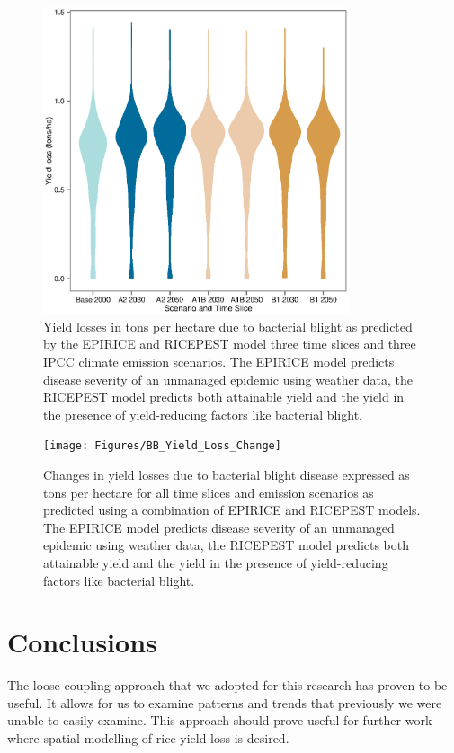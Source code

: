 \documentclass[preprint,12pt]{elsarticle}
\begin{document}
\begin{figure}[H]
  \includegraphics[width = 90mm]{Figures/BB_Losses_Violin}
  \caption{Yield losses in tons per hectare due to bacterial blight as predicted by the EPIRICE and RICEPEST model three time slices and three IPCC climate emission scenarios. The EPIRICE model predicts disease severity of an unmanaged epidemic using weather data, the RICEPEST model predicts both attainable yield and the yield in the presence of yield-reducing factors like bacterial blight.}
  \label{BB_Losses_Violin}
\end{figure}


\begin{figure}[H]
  \texttt{[image: Figures/BB\_Yield\_Loss\_Change]}
  \caption{Changes in yield losses due to bacterial blight disease expressed as tons per hectare for all time slices and emission scenarios as predicted using a combination of EPIRICE and RICEPEST models. The EPIRICE model predicts disease severity of an unmanaged epidemic using weather data, the RICEPEST model predicts both attainable yield and the yield in the presence of yield-reducing factors like bacterial blight.}
  \label{BB_Change_Map}
\end{figure}

\section{Conclusions}
The loose coupling approach that we adopted for this research has proven to be useful. It allows for us to examine patterns and trends that previously we were unable to easily examine. This approach should prove useful for further work where spatial modelling of rice yield loss is desired.
\end{document}
